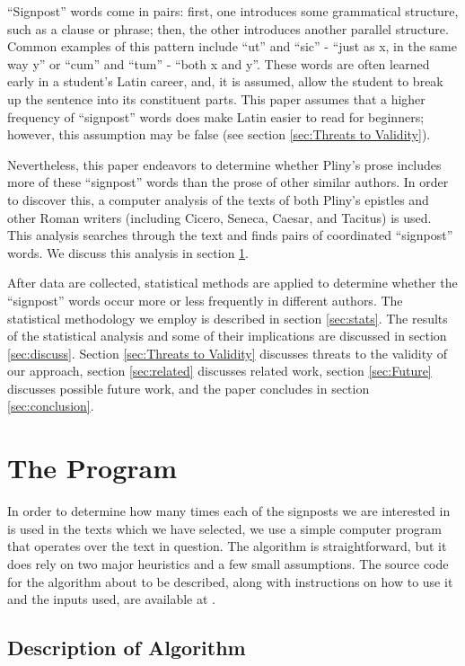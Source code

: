 ``Signpost'' words come in pairs: first, one introduces some grammatical structure, such as a clause or phrase; then, the other introduces another parallel structure. Common examples of this pattern include ``ut'' and ``sic'' - ``just as x, in the same way y'' or ``cum'' and ``tum'' - ``both x and y''. These words are often learned early in a student's Latin career, and, it is assumed, allow the student to break up the sentence into its constituent parts. This paper assumes that a higher frequency of ``signpost'' words does make Latin easier to read for beginners; however, this assumption may be false (see section \ref{sec:Threats to Validity}).

Nevertheless, this paper endeavors to determine whether Pliny's prose includes more of these ``signpost'' words than the prose of other similar authors. In order to discover this, a computer analysis of the texts of both Pliny's epistles and other Roman writers (including Cicero, Seneca, Caesar, and Tacitus) is used. This analysis searches through the text and finds pairs of coordinated ``signpost'' words. We discuss this analysis in section \ref{sec:The Program}.
 
After data are collected, statistical methods are applied to determine whether the ``signpost'' words occur more or less frequently in different authors. The statistical methodology we employ is described in section \ref{sec:stats}. The results of the statistical analysis and some of their implications are discussed in section \ref{sec:discuss}. Section \ref{sec:Threats to Validity} discusses threats to the validity of our approach, section \ref{sec:related} discusses related work, section \ref{sec:Future} discusses possible future work, and the paper concludes in section \ref{sec:conclusion}.

\section{The Program}
\label{sec:The Program}

In order to determine how many times each of the signposts we are interested in is used in the texts which we have selected, we use a simple computer program that operates over the text in question. The algorithm is straightforward, but it does rely on two major heuristics and a few small assumptions. The source code for the algorithm about to be described, along with instructions on how to use it and the inputs used, are available at \cite{github}.

\subsection{Description of Algorithm}


